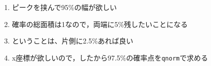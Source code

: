 \begin{enumerate}
	\item ピークを挟んで95\%の幅が欲しい
	\item 確率の総面積は1なので，両端に5\%残したいことになる
	\item ということは、片側に2.5\%あれば良い
	\item x座標が欲しいので，したから97.5\%の確率点を\texttt{qnorm}で求める
\end{enumerate}
